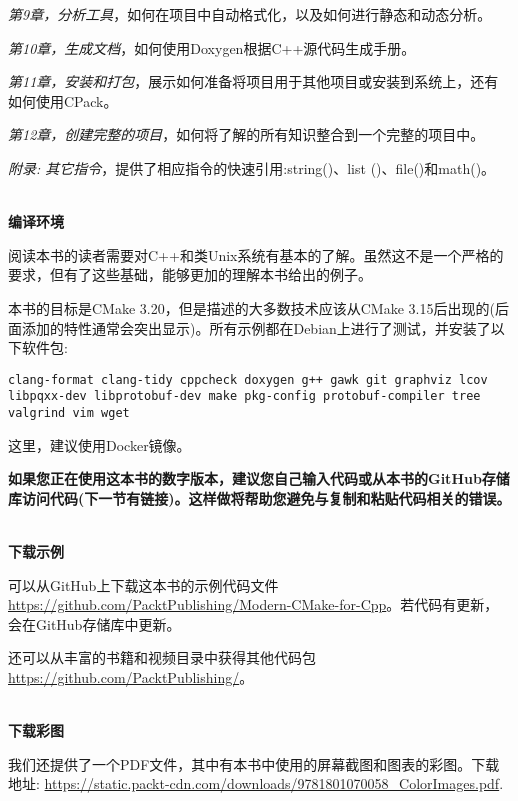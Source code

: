 \textit{第9章，分析工具}，如何在项目中自动格式化，以及如何进行静态和动态分析。

\textit{第10章，生成文档}，如何使用Doxygen根据C++源代码生成手册。

\textit{第11章，安装和打包}，展示如何准备将项目用于其他项目或安装到系统上，还有如何使用CPack。

\textit{第12章，创建完整的项目}，如何将了解的所有知识整合到一个完整的项目中。

\textit{附录: 其它指令}，提供了相应指令的快速引用:string()、list ()、file()和math()。

\hspace*{\fill} \\ %
\textbf{编译环境}

阅读本书的读者需要对C++和类Unix系统有基本的了解。虽然这不是一个严格的要求，但有了这些基础，能够更加的理解本书给出的例子。

本书的目标是CMake 3.20，但是描述的大多数技术应该从CMake 3.15后出现的(后面添加的特性通常会突出显示)。所有示例都在Debian上进行了测试，并安装了以下软件包:

\texttt{clang-format clang-tidy cppcheck doxygen g++ gawk git graphviz lcov libpqxx-dev libprotobuf-dev make pkg-config protobuf-compiler tree valgrind vim wget}

这里，建议使用Docker镜像。

\textbf{如果您正在使用这本书的数字版本，建议您自己输入代码或从本书的GitHub存储库访问代码(下一节有链接)。这样做将帮助您避免与复制和粘贴代码相关的错误。}

\hspace*{\fill} \\ %
\textbf{下载示例}

可以从GitHub上下载这本书的示例代码文件 \url{https://github.com/PacktPublishing/Modern-CMake-for-Cpp}。若代码有更新，会在GitHub存储库中更新。

还可以从丰富的书籍和视频目录中获得其他代码包\url{https://github.com/PacktPublishing/}。


\hspace*{\fill} \\ %
\textbf{下载彩图}

我们还提供了一个PDF文件，其中有本书中使用的屏幕截图和图表的彩图。下载地址: \url{https://static.packt-cdn.com/downloads/9781801070058_ColorImages.pdf}.










